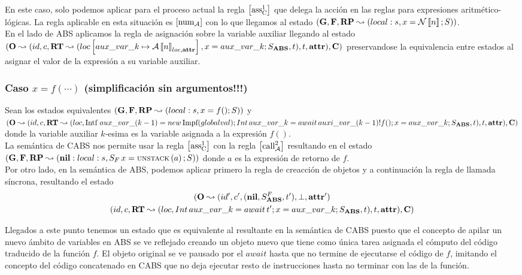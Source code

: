 En este caso, solo podemos aplicar para el proceso actual la regla $\left[ \text{ass}_{\text{C}}^{1} \right]$ que delega la acción en las reglas para expresiones aritmético-lógicas. La regla aplicable en esta situación es $\left[ \text{num}_{\mathcal{A}} \right]$ con lo que llegamos al estado $(\mathbf{G}, \mathbf{F}, \textbf{RP} \leadsto (local:s,x = \mathcal{N}\left\llbracket n \right\rrbracket\mbox{;\,}S))$.\\

En el lado de ABS aplicamos la regla de asignación sobre la variable auxiliar llegando al estado $(\mathbf{O} \leadsto (id, c, \textbf{RT} \leadsto (loc \left[ aux\_var\_k\mapsto\mathcal{A} \left\llbracket n \right\rrbracket_{loc, \textbf{attr}} \right], x = aux\_var\_k\mbox{;\,}S_{\textbf{ABS}}, t), t, \textbf{attr}), \mathbf{C})$ preservandose la equivalencia entre estados al asignar el valor de la expresión a su variable auxiliar.

\subsubsection{Caso $x = f(\cdots)$ (simplificación sin argumentos!!!)}
Sean los estados equivalentes $(\mathbf{G}, \mathbf{F}, \textbf{RP} \leadsto (local:s,x = f()\mbox{;\,}S))$ y $(\mathbf{O} \leadsto (id, c, \textbf{RT} \leadsto (loc, \mbox{Intf }  aux\_var\_(k-1) = new\, \mbox{Impf}(globalval) \mbox{;\,} Int\, aux\_var\_k = await\,auxi\_var\_(k-1)!f()\mbox{;\,} x = aux\_var\_k\mbox{;\,} S_{\textbf{ABS}}, t), t, \textbf{attr}), \mathbf{C})$ donde la variable auxiliar $k$-esima es la variable asignada a la expresión $f()$.\\

La semántica de CABS nos permite usar la regla $\left[ \text{ass}_{\text{C}}^{1} \right]$ con la regla $\left[ \text{call}_{\mathcal{A}}^2 \right]$ resultando en el estado $(\mathbf{G}, \mathbf{F}, \textbf{RP} \leadsto (\textbf{nil}:local:s, S_F\,x = \text{\scriptsize{UNSTACK}}\left(a\right)\mbox{;\,}S))$ donde $a$ es la expresión de retorno de $f$.\\

Por otro lado, en la semántica de ABS, podemos aplicar primero la regla de creacción de objetos y a continuación la regla de llamada síncrona, resultando el estado
\begin{multline*}
  (\mathbf{O} \leadsto (id', c', (\textbf{nil}, S_{\textbf{ABS}}^F, t'), \perp, \textbf{attr}')\\
  (id, c, \textbf{RT} \leadsto (loc, Int\, aux\_var\_k = await\,t'\mbox{;\,} x = aux\_var\_k\mbox{;\,} S_{\textbf{ABS}}, t), t, \textbf{attr}), \mathbf{C})
\end{multline*}

Llegados a este punto tenemos un estado que es equivalente al resultante en la semántica de CABS puesto que el concepto de apilar un nuevo ámbito de variables en ABS se ve reflejado creando un objeto nuevo que tiene como única tarea asignada el cómputo del código traducido de la función $f$. El objeto original se ve pausado por el $await$ hasta que no termine de ejecutarse el código de $f$, imitando el concepto del código concatenado en CABS que no deja ejecutar resto de instrucciones hasta no terminar con las de la función.\\

